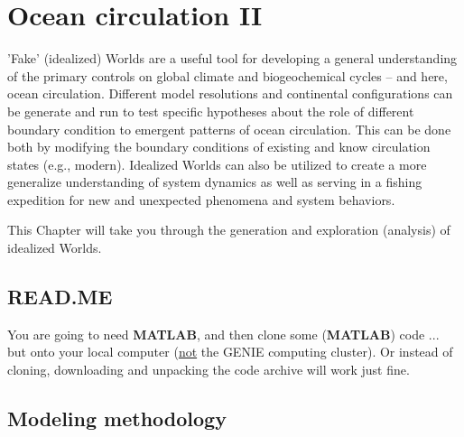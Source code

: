 
\cleardoublepage


\chapter{Ocean circulation II}\label{ch:ocean-circulation-II}

\hfill \break

\noindent 'Fake' (idealized) Worlds are a useful tool for developing a general understanding of the primary controls on global climate and  biogeochemical cycles -- and here, ocean circulation. Different model resolutions and continental configurations can be generate and run to test specific hypotheses about the role of different boundary condition to emergent patterns of ocean circulation. This can be done both by modifying the boundary conditions of existing and know circulation states (e.g., modern). Idealized Worlds can also be utilized to create a more generalize understanding of system dynamics as well as serving in a fishing expedition for new and unexpected phenomena and system behaviors.

This Chapter will take you through the generation and exploration (analysis) of idealized Worlds.

\newpage

\section*{READ.ME}

You are going to need \textbf{MATLAB}, and then clone some (\textbf{MATLAB}) code ... but onto your local computer (\uline{not} the GENIE computing cluster). Or instead of cloning, downloading and unpacking the code archive will work just fine.



\newpage

\section{Modeling methodology}

